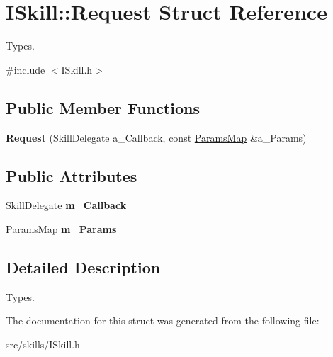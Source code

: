 \hypertarget{struct_i_skill_1_1_request}{}\section{I\+Skill\+:\+:Request Struct Reference}
\label{struct_i_skill_1_1_request}


Types.  




{\ttfamily \#include $<$I\+Skill.\+h$>$}

\subsection*{Public Member Functions}
\begin{DoxyCompactItemize}
\item 
\mbox{\label{struct_i_skill_1_1_request_aece1b358371238b94b1569c69c1c8dfd}} 
{\bfseries Request} (Skill\+Delegate a\+\_\+\+Callback, const \hyperlink{class_params_map}{Params\+Map} \&a\+\_\+\+Params)
\end{DoxyCompactItemize}
\subsection*{Public Attributes}
\begin{DoxyCompactItemize}
\item 
\mbox{\label{struct_i_skill_1_1_request_a8ffe693586a6948d61b2deeaf78041f1}} 
Skill\+Delegate {\bfseries m\+\_\+\+Callback}
\item 
\mbox{\label{struct_i_skill_1_1_request_a53fd2582723078d0191344fd5f655ef5}} 
\hyperlink{class_params_map}{Params\+Map} {\bfseries m\+\_\+\+Params}
\end{DoxyCompactItemize}


\subsection{Detailed Description}
Types. 

The documentation for this struct was generated from the following file\+:\begin{DoxyCompactItemize}
\item 
src/skills/I\+Skill.\+h\end{DoxyCompactItemize}
